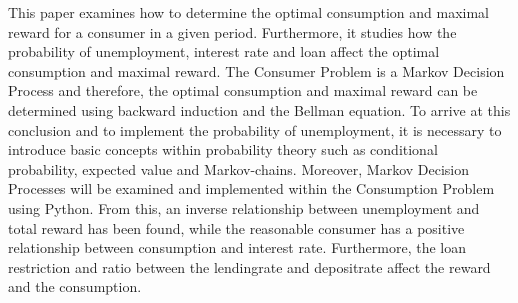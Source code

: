 This paper examines how to determine the optimal consumption and maximal reward for a consumer in a given period. Furthermore, it studies how the probability of unemployment, interest rate and loan affect the optimal consumption and maximal reward. The Consumer Problem is a Markov Decision Process and therefore, the optimal consumption and maximal reward can be determined using backward induction and the Bellman equation. To arrive at this conclusion and to implement the probability of unemployment, it is necessary to introduce basic concepts within probability theory such as conditional probability, expected value and Markov-chains. Moreover, Markov Decision Processes will be examined and implemented within the Consumption Problem using Python.
From this, an inverse relationship between unemployment and total reward has been found, while the reasonable consumer has a positive relationship between consumption and interest rate. Furthermore, the loan restriction and ratio between the lendingrate and depositrate affect the reward and the consumption.




